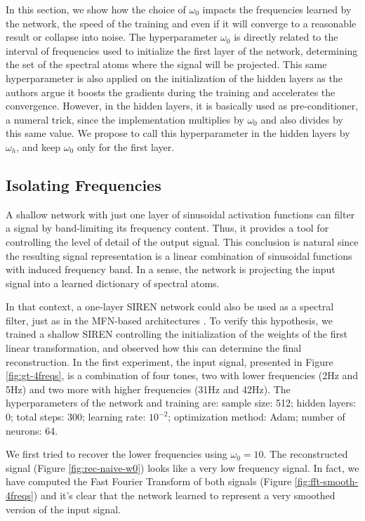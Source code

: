 In this section, we show how the choice of $\omega_0$  impacts the frequencies learned by the network, the speed of the training and even if it will converge to a reasonable result or collapse into noise. The hyperparameter $\omega_0$ is directly related to the interval of frequencies used to initialize the first layer of the network, determining the set of the spectral atoms where the signal will be projected. This same hyperparameter is also applied on the initialization of the hidden layers as the authors argue it boosts the gradients during the training and accelerates the convergence. However, in the hidden layers, it is basically used as pre-conditioner, a numeral trick, since the implementation multiplies by $\omega_0$ and also divides by this same value. We propose to call this hyperparameter in the hidden layers by $\omega_h$, and keep $\omega_0$ only for the first layer.


\subsection{Isolating Frequencies}

A shallow network with just one layer of sinusoidal activation functions can filter a signal by band-limiting its frequency content. Thus, it provides a tool for controlling the level of detail of the output signal. This conclusion is natural since the resulting signal representation is a linear combination of sinusoidal functions with induced frequency band. In a sense, the network is projecting the input signal into a learned dictionary of spectral atoms.

In that context, a one-layer SIREN network could also be used as a spectral filter, just as in the MFN-based architectures \cite{fathony2020multiplicative}. To verify this hypothesis, we trained a shallow SIREN controlling the initialization of the weights of the first linear transformation, and observed how this can determine the final reconstruction. In the first experiment, the input signal, presented in Figure \ref{fig:gt-4freqs}, is a combination of four tones, two with lower frequencies (2Hz and 5Hz) and two more with higher frequencies (31Hz and 42Hz). The hyperparameters of the network and training are: sample size: 512; hidden layers: 0; total steps: 300; learning rate: $10^{-2}$; optimization method: Adam; number of neurons: 64. 

We first tried to recover the lower frequencies using $\omega_0=10$. The reconstructed signal (Figure \ref{fig:rec-naive-w0}) looks like a very low frequency signal. In fact, we have computed the Fast Fourier Transform of both signals (Figure \ref{fig:fft-smooth-4freqs}) and it's clear that the network learned to represent a very smoothed version of the input signal.


